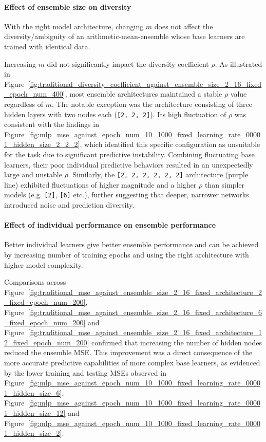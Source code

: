 \paragraph{Effect of ensemble size on diversity}
With the right model architecture, changing $m$ does not affect the diversity/ambiguity of an arithmetic-mean-ensemble whose base learners are trained with identical data. 

Increasing $m$ did not significantly impact the diversity coefficient $\rho$. As illustrated in Figure~\ref{fig:traditional_diversity_coefficient_against_ensemble_size_2_16_fixed_epoch_num_400}, most ensemble architectures maintained a stable $\rho$ value regardless of $m$. The notable exception was the architecture consisting of three hidden layers with two nodes each (\texttt{[2, 2, 2]}). Its high fluctuation of $\rho$ was consistent with the findings in Figure~\ref{fig:mlp_mse_against_epoch_num_10_1000_fixed_learning_rate_00001_hidden_size_2_2_2}, which identified this specific configuration as unsuitable for the task due to significant predictive instability. Combining fluctuating base learners, their poor individual predictive behaviors resulted in an unexpectedly large and unstable $\rho$. Similarly, the \texttt{[2, 2, 2, 2, 2, 2]} architecture (purple line) exhibited fluctuations of higher magnitude and a higher $\rho$ than simpler models (e.g. \texttt{[2]}, \texttt{[6]} etc.), further suggesting that deeper, narrower networks introduced noise and prediction diversity. 

\paragraph{Effect of individual performance on ensemble performance}
Better individual learners give better ensemble performance and can be achieved by increasing number of training epochs and using the right architecture with higher model complexity. 

Comparisons across Figure~\ref{fig:traditional_mse_against_ensemble_size_2_16_fixed_architecture_2_fixed_epoch_num_200}, Figure~\ref{fig:traditional_mse_against_ensemble_size_2_16_fixed_architecture_6_fixed_epoch_num_200} and Figure~\ref{fig:traditional_mse_against_ensemble_size_2_16_fixed_architecture_12_fixed_epoch_num_200} confirmed that increasing the number of hidden nodes reduced the ensemble MSE. This improvement was a direct consequence of the more accurate predictive capabilities of more complex base learners, as evidenced by the lower training and testing MSEs observed in Figure~\ref{fig:mlp_mse_against_epoch_num_10_1000_fixed_learning_rate_00001_hidden_size_6}, Figure~\ref{fig:mlp_mse_against_epoch_num_10_1000_fixed_learning_rate_00001_hidden_size_12} and Figure~\ref{fig:mlp_mse_against_epoch_num_10_1000_fixed_learning_rate_00001_hidden_size_2}. 

